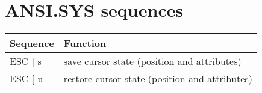\section{ANSI.SYS sequences}

\begin{tabular}{p{9em} | p{}}
\hline
\textbf{Sequence}	& \textbf{Function} \\
\hline
ESC [ s	& save cursor state (position and attributes) \\
ESC [ u	& restore cursor state (position and attributes) \\
\hline
\end{tabular}
